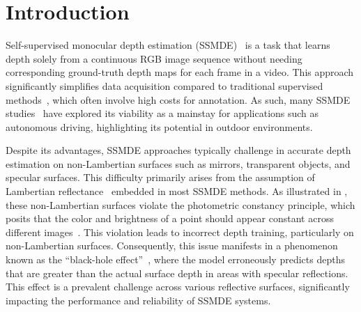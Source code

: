 \section{Introduction}
\label{sec:introduction}

Self-supervised monocular depth estimation (SSMDE)~\citep{godard2019digging} is a task that learns depth solely from a continuous RGB image sequence without needing corresponding ground-truth depth maps for each frame in a video.
This approach significantly simplifies data acquisition compared to traditional supervised methods~\citep{fu2018deep, lee2019big, bhat2021adabins}, which often involve high costs for annotation.
As such, many SSMDE studies~\citep{godard2019digging, zhou2017unsupervised, garg2016unsupervised, guizilini20203d} have explored its viability as a mainstay for applications such as autonomous driving, highlighting its potential in outdoor environments.

Despite its advantages, SSMDE approaches typically challenge in accurate depth estimation on non-Lambertian surfaces such as mirrors, transparent objects, and specular surfaces.
This difficulty primarily arises from the assumption of Lambertian reflectance~\citep{basri2003lambertian} embedded in most SSMDE methods.
As illustrated in , these non-Lambertian surfaces violate the photometric constancy principle, which posits that the color and brightness of a point should appear constant across different images~\citep{godard2017unsupervised}.
This violation leads to incorrect depth training, particularly on non-Lambertian surfaces.
Consequently, this issue manifests in a phenomenon known as the ``black-hole effect''~\citep{shi20233d}, where the model erroneously predicts depths that are greater than the actual surface depth in areas with specular reflections.
This effect is a prevalent challenge across various reflective surfaces, significantly impacting the performance and reliability of SSMDE systems.

